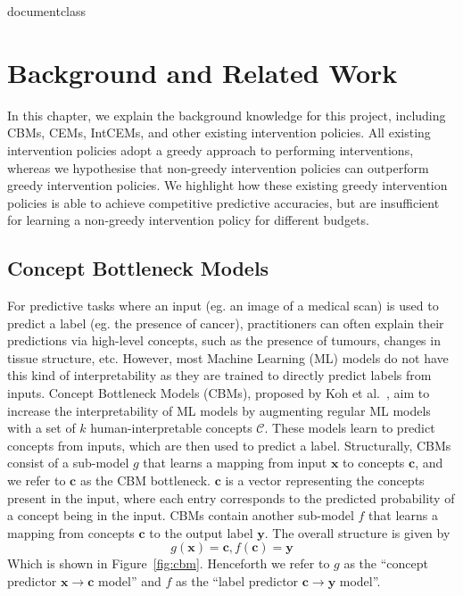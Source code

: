 \csname documentclass

\chapter{Background and Related Work}\label{chapter-2}

In this chapter, we explain the background knowledge
for this project, including CBMs, CEMs, IntCEMs,
and other existing intervention policies. All existing 
intervention policies adopt a greedy approach to performing interventions,
whereas we hypothesise that non-greedy intervention policies can outperform greedy intervention policies.
We highlight how these existing greedy intervention policies is able to achieve competitive 
predictive accuracies,
but are insufficient
for learning a non-greedy
intervention policy for different budgets.

\section{Concept Bottleneck Models}\label{background:cbm}
For predictive tasks where an input (eg. an image of a medical scan)
is used to predict a label (eg. the presence of cancer),
practitioners can often explain their predictions
via high-level concepts, such as the presence of tumours,
changes in tissue structure, etc. However, 
most Machine Learning (ML) models do not have this kind of interpretability as they are trained to directly
predict labels from inputs.
Concept Bottleneck Models (CBMs), proposed by Koh et al.~\cite{cbm}, aim to increase the interpretability 
of ML models
by augmenting regular ML models with a set of $k$
human-interpretable concepts $\mathcal{C}$. These models learn to predict concepts from inputs, which are then used to predict a label.
Structurally, CBMs consist of a sub-model $g$ that learns a mapping from
input $\mathbf{x}$ to concepts $\mathbf{c}$, and we refer to $\mathbf{c}$
as the CBM bottleneck.
$\mathbf{c}$ is a vector representing the concepts present in the input, 
where each entry corresponds to the predicted probability of a concept being in the input.
CBMs contain another sub-model $f$
that learns a mapping from concepts $\mathbf{c}$
to the output label $\mathbf{y}$.
The overall structure is given by
\[g(\mathbf{x}) = \mathbf{c}, f(\mathbf{c}) = \mathbf{y}\]
Which is shown in Figure~\ref{fig:cbm}.
Henceforth we refer to $g$ as the ``concept predictor $\mathbf{x} \to \mathbf{c}$ model'' and $f$ as the
``label  predictor $\mathbf{c} \to \mathbf{y}$ model''.

